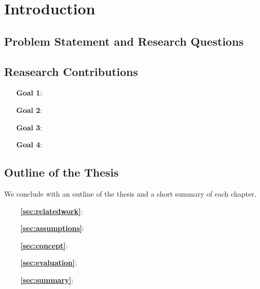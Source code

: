
\cleardoublepage\chapter{Introduction}\minitoc\label{sec:introduction}\vspace{.5cm}
\noindent\lipsum[7]

\section{Problem Statement and Research Questions}
\lipsum[7]

\section{Reasearch Contributions}
\lipsum[7]
\begin{itemize}
  \item[\textbf{Goal 1}:]
  \lipsum[5]

  \item[\textbf{Goal 2}:]
  \lipsum[5]

  \item[\textbf{Goal 3}:]
  \lipsum[5]

  \item[\textbf{Goal 4}:]
  \lipsum[5]
\end{itemize}

\section{Outline of the Thesis}
We conclude with an outline of the thesis and a short summary of each chapter.
\begin{itemize}
  \item[\textbf{\chaptername~\ref{sec:relatedwork}}:]
  \lipsum[5]

  \item[\textbf{\chaptername~\ref{sec:assumptions}}:]
  \lipsum[5]

  \item[\textbf{\chaptername~\ref{sec:concept}}:]
  \lipsum[5]

  \item[\textbf{\chaptername~\ref{sec:evaluation}}:]
  \lipsum[5]

  \item[\textbf{\chaptername~\ref{sec:summary}}:]
  \lipsum[5]
\end{itemize}

